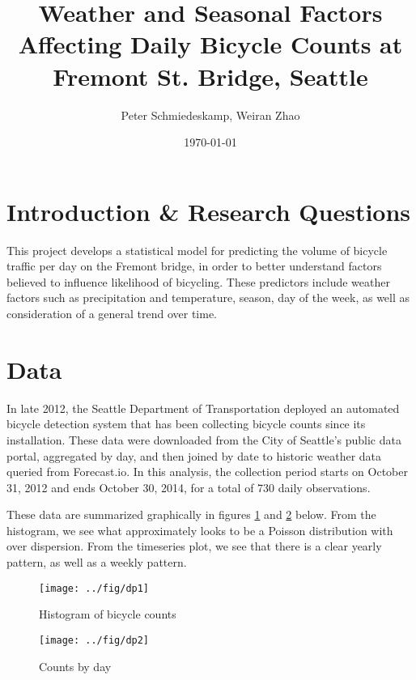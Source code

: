 \documentclass[final]{beamer}
\title
[CSSS 501 MLE Poster Session, 17 November 2014 -- http://github.com/pschmied/bikecounts-mle] %
{ %
  Weather and Seasonal Factors Affecting Daily Bicycle Counts at
  Fremont St. Bridge, Seattle %
}
\author{ %
Peter Schmiedeskamp\inst{1}, Weiran Zhao\inst{1}
}
\institute
[University of Washington] %
{
\inst{1} University of Washington, Seattle
}
\date{\today}
\begin{document}
\begin{frame}[t]
\begin{multicols}{3}

\section{Introduction \& Research Questions}
This project develops a statistical model for predicting the volume of
bicycle traffic per day on the Fremont bridge, in order to better
understand factors believed to influence likelihood of bicycling.
These predictors include weather factors such as precipitation and
temperature, season, day of the week, as well as consideration of a
general trend over time.

\section{Data}
In late 2012, the Seattle Department of Transportation deployed an
automated bicycle detection system that has been collecting bicycle
counts since its installation. These data were downloaded from the
City of Seattle's public data portal, aggregated by day, and then
joined by date to historic weather data queried from Forecast.io. In
this analysis, the collection period starts on October 31, 2012 and
ends October 30, 2014, for a total of 730 daily observations.

These data are summarized graphically in figures \ref{fg:hist} and
\ref{fg:timeseries} below. From the histogram, we see what
approximately looks to be a Poisson distribution with over dispersion.
From the timeseries plot, we see that there is a clear yearly pattern,
as well as a weekly pattern.

\begin{figure}[htbp]
\begin{center}
\texttt{[image: ../fig/dp1]}
\caption{Histogram of bicycle counts}
\label{fg:hist}
\end{center}
\end{figure}

\begin{figure}[htbp]
\begin{center}
\texttt{[image: ../fig/dp2]}
\caption{Counts by day}
\label{fg:timeseries}
\end{center}
\end{figure}



\end{multicols}
\end{frame}
\end{document}
